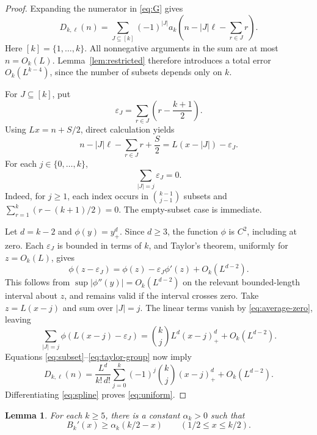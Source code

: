 \documentclass[3p,11pt,number]{elsarticle}
\newtheorem{lemma}[theorem]{Lemma}
\theoremstyle{remark}
\numberwithin{equation}{section}
\begin{document}
\begin{proof}
Expanding the numerator in \eqref{eq:G} gives
\begin{equation}\label{eq:subset}
D_{k,\ell}(n)=
\sum_{J\subseteq[k]}(-1)^{|J|}
a_k\left(n-|J|\ell-\sum_{r\in J}r\right).
\end{equation}
Here \([k]=\{1,\ldots,k\}\).
All nonnegative arguments in the sum are at most
\(n=O_k(L)\). Lemma~\ref{lem:restricted} therefore introduces a total
error \(O_k(L^{k-4})\), since the number of subsets depends only on
\(k\).

For \(J\subseteq[k]\), put
\[
\varepsilon_J=\sum_{r\in J}\left(r-\frac{k+1}{2}\right).
\]
Using \(Lx=n+S/2\), direct calculation yields
\begin{equation}\label{eq:exact-shift}
n-|J|\ell-\sum_{r\in J}r+\frac S2
=L(x-|J|)-\varepsilon_J.
\end{equation}
For each \(j\in\{0,\ldots,k\}\),
\begin{equation}\label{eq:average-zero}
\sum_{|J|=j}\varepsilon_J=0.
\end{equation}
Indeed, for \(j\ge1\), each index occurs in
\(\binom{k-1}{j-1}\) subsets and
\(\sum_{r=1}^{k}(r-(k+1)/2)=0\).
The empty-subset case is immediate.

Let \(d=k-2\) and \(\phi(y)=y_+^d\).
Since \(d\ge3\), the function \(\phi\) is \(C^2\), including at zero.
Each \(\varepsilon_J\) is bounded in terms of \(k\), and Taylor's
theorem, uniformly for \(z=O_k(L)\), gives
\[
\phi(z-\varepsilon_J)
=\phi(z)-\varepsilon_J\phi'(z)+O_k(L^{d-2}).
\]
This follows from
\(\sup|\phi''(y)|=O_k(L^{d-2})\) on the relevant bounded-length
interval about \(z\), and remains valid if the interval crosses zero.
Take \(z=L(x-j)\) and sum over \(|J|=j\).
The linear terms vanish by \eqref{eq:average-zero}, leaving
\begin{equation}\label{eq:taylor-group}
\sum_{|J|=j}\phi(L(x-j)-\varepsilon_J)
=\binom{k}{j}L^d(x-j)_+^d+O_k(L^{d-2}).
\end{equation}
Equations \eqref{eq:subset}--\eqref{eq:taylor-group} now imply
\[
D_{k,\ell}(n)=
\frac{L^d}{k!\,d!}
\sum_{j=0}^{k}(-1)^j\binom{k}{j}(x-j)_+^d
+O_k(L^{d-2}).
\]
Differentiating \eqref{eq:spline} proves \eqref{eq:uniform}.
\end{proof}

\begin{lemma}\label{lem:curvature}
For each \(k\ge5\), there is a constant \(\alpha_k>0\) such that
\begin{equation}\label{eq:derivative-lower}
B_k'(x)\ge\alpha_k(k/2-x)
\qquad(1/2\le x\le k/2).
\end{equation}
\end{lemma}
\end{document}
